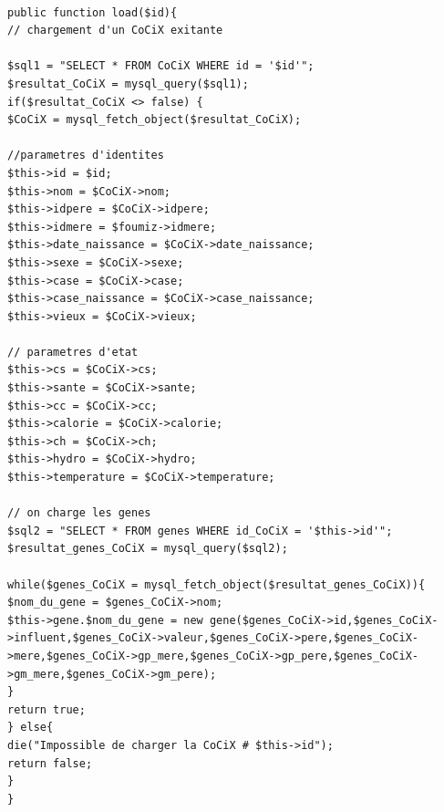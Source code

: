 \documentclass[french]{report}
\newlength{\du}\fi
\begin{document}
\begin{lstlisting}[caption={Chargement d'une CoCiX}]

public function load($id){
// chargement d'un CoCiX exitante

$sql1 = "SELECT * FROM CoCiX WHERE id = '$id'";
$resultat_CoCiX = mysql_query($sql1);
if($resultat_CoCiX <> false) {
$CoCiX = mysql_fetch_object($resultat_CoCiX);

//parametres d'identites
$this->id = $id;
$this->nom = $CoCiX->nom;
$this->idpere = $CoCiX->idpere;
$this->idmere = $foumiz->idmere;
$this->date_naissance = $CoCiX->date_naissance;
$this->sexe = $CoCiX->sexe;
$this->case = $CoCiX->case;
$this->case_naissance = $CoCiX->case_naissance;
$this->vieux = $CoCiX->vieux;

// parametres d'etat
$this->cs = $CoCiX->cs;
$this->sante = $CoCiX->sante;
$this->cc = $CoCiX->cc;
$this->calorie = $CoCiX->calorie;
$this->ch = $CoCiX->ch;
$this->hydro = $CoCiX->hydro;
$this->temperature = $CoCiX->temperature;

// on charge les genes
$sql2 = "SELECT * FROM genes WHERE id_CoCiX = '$this->id'";
$resultat_genes_CoCiX = mysql_query($sql2);

while($genes_CoCiX = mysql_fetch_object($resultat_genes_CoCiX)){
$nom_du_gene = $genes_CoCiX->nom;
$this->gene.$nom_du_gene = new gene($genes_CoCiX->id,$genes_CoCiX->influent,$genes_CoCiX->valeur,$genes_CoCiX->pere,$genes_CoCiX->mere,$genes_CoCiX->gp_mere,$genes_CoCiX->gp_pere,$genes_CoCiX->gm_mere,$genes_CoCiX->gm_pere);											}
return true;
} else{
die("Impossible de charger la CoCiX # $this->id");
return false;
}
}
\end{lstlisting}	
\end{document}
